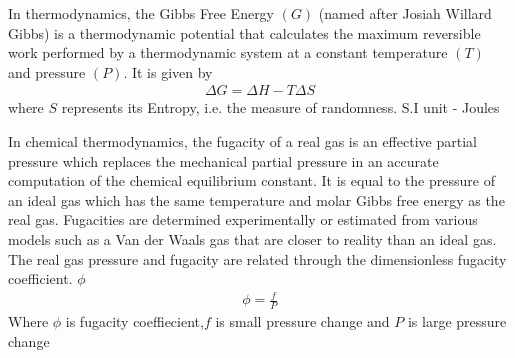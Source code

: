 \begin{chembox}{}
{In thermodynamics, the {Gibbs Free Energy} $(G)$ (named after Josiah Willard Gibbs) is a {thermodynamic potential} that calculates the {maximum reversible work} performed by a thermodynamic system at a {constant temperature} $(T)$ and pressure{} $(P)$. It is given by 
\begin{align*} 
    \Delta G=\Delta H-T\Delta S 
\end{align*} where $S$ represents its {Entropy}, i.e. the measure of randomness. {S.I unit - Joules}}
\end{chembox}
\begin{chembox}{}
    {In chemical thermodynamics, the fugacity of a real gas is an effective partial pressure which replaces the mechanical partial pressure in an accurate computation of the chemical equilibrium constant. It is equal to the pressure of an ideal gas which has the same temperature and molar Gibbs free energy as the real gas.}
    {Fugacities are determined experimentally or estimated from various models such as a Van der Waals gas that are closer to reality than an ideal gas. The real gas pressure and fugacity are related through the dimensionless fugacity coefficient. $\phi$}
    \begin{align*}
        \phi = \frac{f}{P}
    \end{align*}
    {Where $\phi$ is fugacity coeffiecient,$f$ is small pressure change and $P$ is large pressure change}
\end{chembox}
